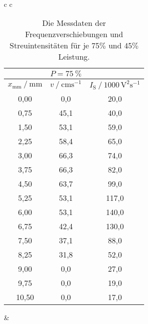 \begin{table}[H]
  \centering
  \caption{Die Messdaten der Frequenzverschiebungen und Streuintensitäten für je 75$\%$ und 45$\%$ Leistung.}
  \label{tab:profil}

  \begin{tabular}{c c}   %
      \begin{tabular}{c c c} 
          \hline
          \toprule
           & $P = \qty{75}{\percent}$ & \\
          \midrule
          $x_\text{mm} \mathbin{/} \unit{\milli\meter}$ &
          $v \mathbin{/} \mathrm{cm s^{-1}}$ &
          $I_\text{S} \mathbin{/} \mathrm{1000 \, V^2 s^{-1}}$ \\
          \midrule
          0,00 &  0,0 &  20,0 \\
          0,75 & 45,1 &  40,0 \\
          1,50 & 53,1 &  59,0 \\
          2,25 & 58,4 &  65,0 \\
          3,00 & 66,3 &  74,0 \\
          3,75 & 66,3 &  82,0 \\
          4,50 & 63,7 &  99,0 \\
          5,25 & 53,1 & 117,0 \\
          6,00 & 53,1 & 140,0 \\
          6,75 & 42,4 & 130,0 \\
          7,50 & 37,1 &  88,0 \\
          8,25 & 31,8 &  52,0 \\
          9,00 &  0,0 &  27,0 \\
          9,75 &  0,0 &  19,0 \\
         10,50 &  0,0 &  17,0 \\
 
          \bottomrule
          \hline
      \end{tabular} &  %


\end{tabular}
\end{table}
